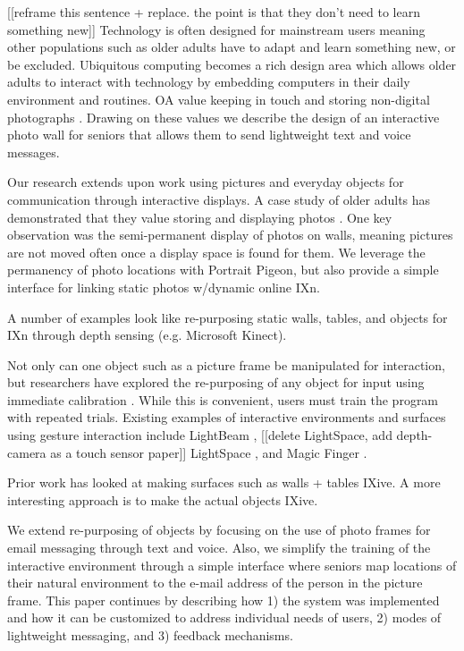 \documentclass{chi-ext}
\begin{document}
[[reframe this sentence + replace. the point is that they don't need to learn something new]] Technology is often designed for mainstream users meaning other populations such as older adults have to adapt and learn something new, or be excluded. Ubiquitous computing becomes a rich design area which allows older adults to interact with technology by embedding computers in their daily environment and routines. OA value keeping in touch and storing non-digital photographs \cite{}. Drawing on these values we describe the design of an interactive photo wall for seniors that allows them to send lightweight text and voice messages. 

Our research extends upon work using pictures and everyday objects for communication through interactive displays. A case study of older adults has demonstrated that they value storing and displaying photos \cite{Swan2008}. One key observation was the semi-permanent display of photos on walls, meaning pictures are not moved often once a display space is found for them. We leverage the permanency of photo locations with Portrait Pigeon, but also provide a simple interface for linking static photos w/dynamic online IXn.

A number of examples look like re-purposing static walls, tables, and objects for IXn through depth sensing (e.g. Microsoft Kinect).

Not only can one object such as a picture frame be manipulated for interaction, but researchers have explored the re-purposing of any object for input using immediate calibration \cite{Corsten2013}. While this is convenient, users must train the program with repeated trials. Existing examples of interactive environments and surfaces using gesture interaction include LightBeam \cite{Lightbeam2012}, [[delete LightSpace, add depth-camera as a touch sensor paper]] LightSpace \cite{Wilson2010}, and Magic Finger \cite{Yang2012}. 

Prior work has looked at making surfaces such as walls + tables IXive. A more interesting approach is to make the actual objects IXive.

We extend re-purposing of objects by focusing on the use of photo frames for email messaging through text and voice. Also, we simplify the training of the interactive environment through a simple interface where seniors map locations of their natural environment to the e-mail address of the person in the picture frame. This paper continues by describing how 1) the system was implemented and how it can be customized to address individual needs of users, 2) modes of lightweight messaging, and 3) feedback mechanisms.
\end{document}
